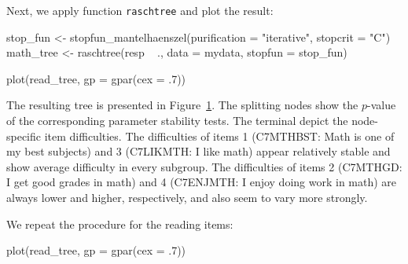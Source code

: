 \documentclass[doc,floatsintext,natbib]{apa7}
\begin{document}
Next, we apply function \verb|raschtree| and plot the result:

\begin{Schunk}
\begin{Sinput}
 stop_fun <- stopfun_mantelhaenszel(purification = "iterative", stopcrit = "C")
 math_tree <- raschtree(resp ~ ., data = mydata, stopfun = stop_fun)
\end{Sinput}
\end{Schunk}

\begin{Schunk}
\begin{Sinput}
 plot(read_tree, gp = gpar(cex = .7))
\end{Sinput}
\end{Schunk}

The resulting tree is presented in Figure~\ref{fig:math_tree}. The splitting nodes show the $p$-value of the corresponding parameter stability tests. The terminal depict the node-specific item difficulties. The difficulties of items 1 (C7MTHBST: Math is one of my best subjects) and 3 (C7LIKMTH: I like math) appear relatively stable and show average difficulty in every subgroup. The difficulties of items 2 (C7MTHGD: I get good grades in math) and 4 (C7ENJMTH: I enjoy doing work in math) are always lower and higher, respectively, and also seem to vary more strongly. 



\begin{figure}%
\caption{Rasch tree for the four math items.}
\begin{subfigure}{1.25\textwidth}
\end{subfigure}
\label{fig:math_tree}
\end{figure}%

We repeat the procedure for the reading items:

\begin{Schunk}
\end{Schunk}

\begin{Schunk}
\begin{Sinput}
 plot(read_tree, gp = gpar(cex = .7))
\end{Sinput}
\end{Schunk}
\end{document}
